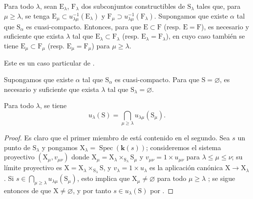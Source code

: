 \begin{corollary}[8.3.5]
\label{IV.8.3.5}
Para todo $\lambda$, sean $\mathrm{E}_\lambda$, $\mathrm{F}_\lambda$ dos subconjuntos constructibles de $\mathrm{S}_\lambda$ tales que, para $\mu\geqslant\lambda$, se tenga $\mathrm{E}_\mu\subset u_{\lambda\mu}^{-1}(\mathrm{E}_\lambda)$ y $\mathrm{F}_\mu\supset u_{\lambda\mu}^{-1}(\mathrm{F}_\lambda)$.
Supongamos que existe $\alpha$ tal que $\mathrm{S}_\alpha$ es cuasi-compacto.
Entonces, para que $\mathrm{E}\subset\mathrm{F}$ \textnormal{(}resp. $\mathrm{E}=\mathrm{F}$\textnormal{)}, es necesario y suficiente que exista $\lambda$ tal que $\mathrm{E}_\lambda\subset\mathrm{F}_\lambda$ \textnormal{(}resp. $\mathrm{E}_\lambda=\mathrm{F}_\lambda$\textnormal{)}, en cuyo caso también se tiene $\mathrm{E}_\mu\subset\mathrm{F}_\mu$ \textnormal{(}resp. $\mathrm{E}_\mu=\mathrm{F}_\mu$\textnormal{)} para $\mu\geqslant\lambda$.

Este es un caso particular de .
\end{corollary}

\begin{corollary}[8.3.6]
\label{IV.8.3.6}
Supongamos que existe $\alpha$ tal que $\mathrm{S}_\alpha$ es cuasi-compacto.
Para que $\mathrm{S}=\varnothing$, es necesario y suficiente que exista $\lambda$ tal que $\mathrm{S}_\lambda=\varnothing$.
\end{corollary}

\begin{corollary}[8.3.7]
\label{IV.8.3.7}
Para todo $\lambda$, se tiene
\begin{equation}
  u_\lambda(\mathrm{S})=\bigcap_{\mu\geqslant\lambda}u_{\lambda\mu}(\mathrm{S}_\mu).
  \tag{8.3.7.1}
\label{IV.8.3.7.1}
\end{equation}
\end{corollary}

\begin{proof}
Es claro que el primer miembro de  está contenido en el segundo.
Sea $s$ un punto de $\mathrm{S}_\lambda$ y pongamos $\mathrm{X}_\lambda=\operatorname{Spec}(\boldsymbol{k}(s))$; consideremos el sistema proyectivo $(\mathrm{X}_\mu,v_{\mu\nu})$ donde $\mathrm{X}_\mu=\mathrm{X}_\lambda\times_{\mathrm{S}_\lambda}\mathrm{S}_\mu$ y $v_{\mu\nu}=1\times u_{\mu\nu}$ para $\lambda\leqslant\mu\leqslant\nu$; su límite proyectivo es $\mathrm{X}=\mathrm{X}_\lambda\times_{\mathrm{S}_\lambda}\mathrm{S}$, y $v_\lambda=1\times u_\lambda$ es la aplicación canónica $\mathrm{X}\to\mathrm{X}_\lambda$ .
Si $s\in\bigcap_{\mu\geqslant\lambda}u_{\lambda\mu}(\mathrm{S}_\mu)$, esto implica que $\mathrm{X}_\mu\neq\varnothing$ para todo $\mu\geqslant\lambda$ ; se sigue entonces de  que $\mathrm{X}\neq\varnothing$, y por tanto $s\in u_\lambda(\mathrm{S})$ por .
\end{proof}

